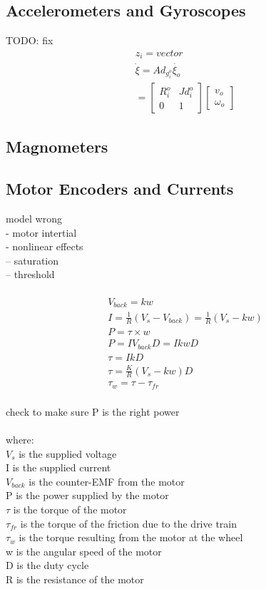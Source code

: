 \documentclass[a4paper,10pt]{report}
\begin{document}
\subsection{Accelerometers and Gyroscopes}
TODO: fix
\begin{gather*}
z_{i} = vector \\
\dot{\xi} = Ad_{g^{o}_{i}} \dot{\xi_{o}} \\
 = \begin{bmatrix} R^{o}_{i} & J  d^{o}_{i} \\ 0 & 1 \end{bmatrix} \begin{bmatrix} v_{o} \\ \omega_{o} \end{bmatrix}
\end{gather*}
\subsection{Magnometers}

\subsection{Motor Encoders and Currents}
model wrong \\
- motor intertial \\
- nonlinear effects \\
-- saturation \\
-- threshold \\
\\
\begin{gather*}
V_{back} = k w \\
I = \frac{1}{R} (V_{s} - V_{back}) = \frac{1}{R} (V_{s} - k w) \\
P = \tau \times w \\
P = I V_{back} D = I k w D \\
\tau = I k D \\
\tau = \frac{K}{R} \left( V_{s} - k w \right) D \\
\tau _{w} = \tau - \tau _{fr} \\
\end{gather*}

check to make sure P is the right power\\
\\
where: \\
$V_s$ is the supplied voltage \\
I is the supplied current \\
$V_{back}$ is the counter-EMF from the motor \\
P is the power supplied by the motor \\
$\tau$ is the torque of the motor \\
$\tau _{fr}$ is the torque of the friction due to the drive train \\
$ \tau _{w} $ is the torque resulting from the motor at the wheel \\
w is the angular speed of the motor \\
D is the duty cycle \\
R is the resistance of the motor \\
\end{document}
